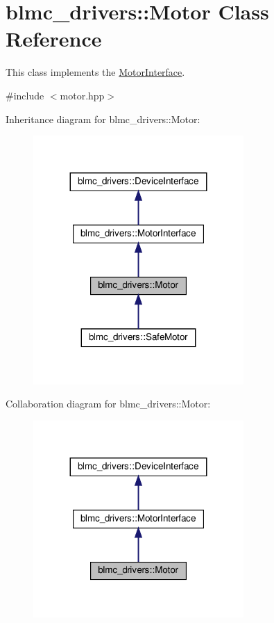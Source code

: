 \hypertarget{classblmc__drivers_1_1Motor}{}\section{blmc\+\_\+drivers\+:\+:Motor Class Reference}
\label{classblmc__drivers_1_1Motor}


This class implements the \hyperlink{classblmc__drivers_1_1MotorInterface}{Motor\+Interface}.  




{\ttfamily \#include $<$motor.\+hpp$>$}



Inheritance diagram for blmc\+\_\+drivers\+:\+:Motor\+:
\nopagebreak
\begin{figure}[H]
\begin{center}
\leavevmode
\includegraphics[width=227pt]{classblmc__drivers_1_1Motor__inherit__graph}
\end{center}
\end{figure}


Collaboration diagram for blmc\+\_\+drivers\+:\+:Motor\+:
\nopagebreak
\begin{figure}[H]
\begin{center}
\leavevmode
\includegraphics[width=227pt]{classblmc__drivers_1_1Motor__coll__graph}
\end{center}
\end{figure}
